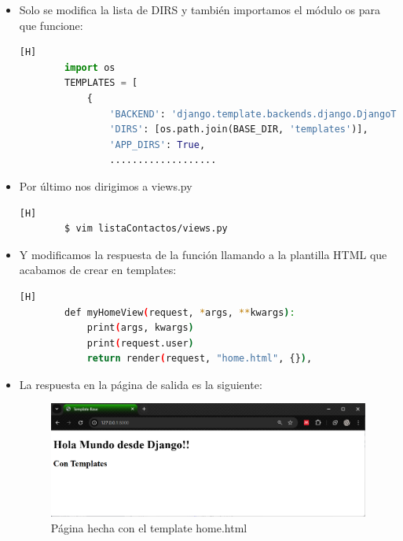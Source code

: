 \documentclass{article}
\begin{document}
\begin{itemize}
            \item Solo se modifica la lista de DIRS y también importamos el módulo os para que funcione:
            
        \begin{lstlisting}[language=Python,caption={Configurando templates}][H]
        import os
        TEMPLATES = [
            {
                'BACKEND': 'django.template.backends.django.DjangoTemplates',
                'DIRS': [os.path.join(BASE_DIR, 'templates')],
                'APP_DIRS': True,
                ...................
        \end{lstlisting}

            \item Por último nos dirigimos a views.py

        \begin{lstlisting}[language=bash,caption={Ingresando a views.py}][H]
        $ vim listaContactos/views.py
        \end{lstlisting}

            \item Y modificamos la respuesta de la función llamando a la plantilla HTML que acabamos de crear en templates:
            
        \begin{lstlisting}[language=bash,caption={Respuesta render del template home.html}][H]
        def myHomeView(request, *args, **kwargs):
            print(args, kwargs)
            print(request.user)
            return render(request, "home.html", {}),
        \end{lstlisting}

            \item La respuesta en la página de salida es la siguiente:

        \begin{figure}[H]
            \centering
            \includegraphics[width=1\linewidth]{img/Template1.png}
            \caption{Página hecha con el template home.html}
            \label{fig:enter-label}
        \end{figure}


\end{itemize}
\end{document}
